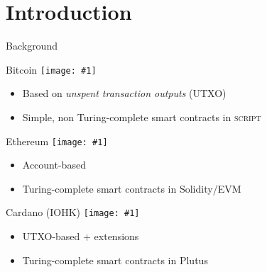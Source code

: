 \section{Introduction}


\newcommand\withLogo[2]{#2 \hfill \texttt{[image: \#1]}}

\begin{frame}{Background}

\begin{alertblock}{\withLogo{bitcoin}{Bitcoin}}
\begin{itemize}
\item Based on \textit{unspent transaction outputs} (UTXO)
\item Simple, non Turing-complete smart contracts in \textsc{script}
\end{itemize}
\end{alertblock}

\begin{alertblock}{\withLogo{ethereum}{Ethereum}}
\begin{itemize}
\item Account-based
\item Turing-complete smart contracts in Solidity/EVM
\end{itemize}
\end{alertblock}

\begin{alertblock}{\withLogo{ada}{Cardano (IOHK)}}
\begin{itemize}
\item UTXO-based + extensions
\item Turing-complete smart contracts in Plutus
\end{itemize}
\end{alertblock}

\end{frame}

